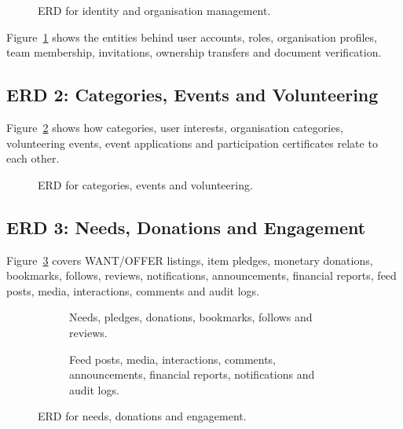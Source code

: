 \begin{figure}[H]
    \centering
    \caption{ERD for identity and organisation management.}
    \label{fig:erd-identity}
\end{figure}
\noindent Figure~\ref{fig:erd-identity} shows the entities behind user accounts, roles, organisation profiles, team membership, invitations, ownership transfers and document verification.

\subsection{ERD 2: Categories, Events and Volunteering}

Figure~\ref{fig:erd-events} shows how categories, user interests, organisation categories, volunteering events, event applications and participation certificates relate to each other.

\begin{figure}[H]
    \centering
    \caption{ERD for categories, events and volunteering.}
    \label{fig:erd-events}
\end{figure}

\clearpage
\subsection{ERD 3: Needs, Donations and Engagement}

Figure~\ref{fig:erd-engagement} covers WANT/OFFER listings, item pledges, monetary donations, bookmarks, follows, reviews, notifications, announcements, financial reports, feed posts, media, interactions, comments and audit logs.

\begin{figure}[H]
    \centering
    \begin{subfigure}[t]{\textwidth}
        \centering
        \caption{Needs, pledges, donations, bookmarks, follows and reviews.}
    \end{subfigure}
    \par\vspace{0.2in}
    \begin{subfigure}[t]{\textwidth}
        \centering
        \caption{Feed posts, media, interactions, comments, announcements, financial reports, notifications and audit logs.}
    \end{subfigure}
    \caption{ERD for needs, donations and engagement.}
    \label{fig:erd-engagement}
\end{figure}

